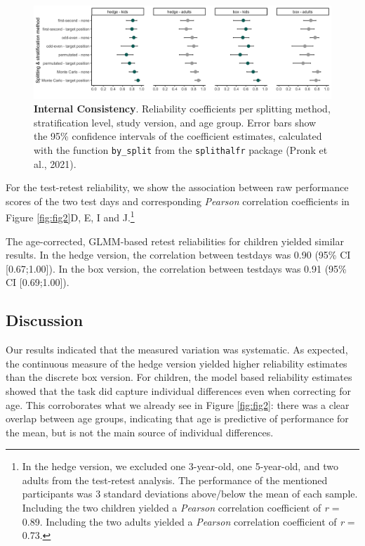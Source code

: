 \documentclass[
  man,floatsintext]{apa6}
\begin{document}
\begin{figure}

{\centering \includegraphics[width=1\linewidth]{../figures/gafo_splithalf} 

}

\caption{\textbf{Internal Consistency}. Reliability coefficients per splitting method, stratification level, study version, and age group. Error bars show the 95\% confidence intervals of the coefficient estimates, calculated with the function \texttt{by\_split} from the \texttt{splithalfr} package (Pronk et al., 2021).}\label{fig:fig3}
\end{figure}

For the test-retest reliability, we show the association between raw performance scores of the two test days and corresponding \emph{Pearson} correlation coefficients in Figure \ref{fig:fig2}D, E, I and J.\footnote{In the hedge version, we excluded one 3-year-old, one 5-year-old, and two adults from the test-retest analysis.
  The performance of the mentioned participants was 3 standard deviations above/below the mean of each sample.
  Including the two children yielded a \emph{Pearson} correlation coefficient of \emph{r} = 0.89.
  Including the two adults yielded a \emph{Pearson} correlation coefficient of \emph{r} = 0.73.}

The age-corrected, GLMM-based retest reliabilities for children yielded similar results.
In the hedge version, the correlation between testdays was 0.90 (95\% CI {[}0.67;1.00{]}).
In the box version, the correlation between testdays was 0.91 (95\% CI {[}0.69;1.00{]}).

\hypertarget{discussion-1}{%
\subsection{Discussion}\label{discussion-1}}

Our results indicated that the measured variation was systematic.
As expected, the continuous measure of the hedge version yielded higher reliability estimates than the discrete box version.
For children, the model based reliability estimates showed that the task did capture individual differences even when correcting for age.
This corroborates what we already see in Figure \ref{fig:fig2}: there was a clear overlap between age groups, indicating that age is predictive of performance for the mean, but is not the main source of individual differences.
\end{document}
